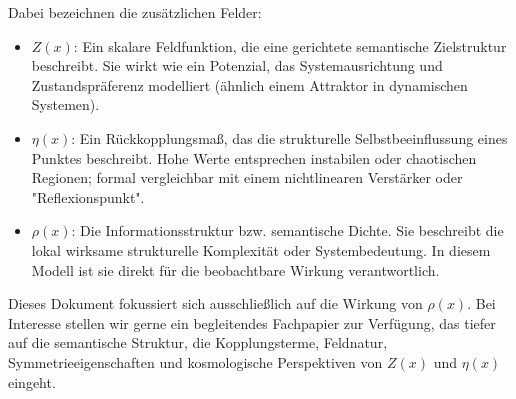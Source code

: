 \documentclass[11pt]{article}
\begin{document}
Dabei bezeichnen die zusätzlichen Felder:

\begin{itemize}
  \item $Z(x)$: Ein skalare Feldfunktion, die eine gerichtete semantische Zielstruktur beschreibt.
  Sie wirkt wie ein Potenzial, das Systemausrichtung und Zustandspräferenz modelliert (ähnlich einem Attraktor in dynamischen Systemen).
  
  \item $\eta(x)$: Ein Rückkopplungsmaß, das die strukturelle Selbstbeeinflussung eines Punktes beschreibt.
  Hohe Werte entsprechen instabilen oder chaotischen Regionen; formal vergleichbar mit einem nichtlinearen Verstärker oder "Reflexionspunkt".

  \item $\rho(x)$: Die Informationsstruktur bzw. semantische Dichte. Sie beschreibt die lokal wirksame strukturelle Komplexität oder Systembedeutung.
  In diesem Modell ist sie direkt für die beobachtbare Wirkung verantwortlich.
\end{itemize}

Dieses Dokument fokussiert sich ausschließlich auf die Wirkung von $\rho(x)$.  
Bei Interesse stellen wir gerne ein begleitendes Fachpapier zur Verfügung, das tiefer auf die semantische Struktur,  
die Kopplungsterme, Feldnatur, Symmetrieeigenschaften und kosmologische Perspektiven von $Z(x)$ und $\eta(x)$ eingeht.
\end{document}
